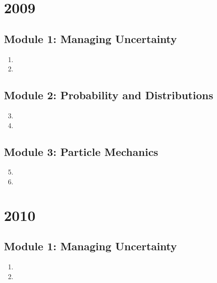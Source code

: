 \documentclass[fleqn,titlepage]{book}
\numberwithin{equation}{section}
\theoremstyle{plain}
\theoremstyle{definition}
\theoremstyle{remark}
\begin{document}
\chapter{2009}
\section{Module 1: Managing Uncertainty}
\begin{enumerate}[label=\bfseries  \arabic*.]\setcounter{enumi}{0}
\item 
\item 
\end{enumerate}
\section{Module 2: Probability and Distributions}
\begin{enumerate}[label=\bfseries  \arabic*.]\setcounter{enumi}{2}
\item 
\item 
\end{enumerate}
\section{Module 3: Particle Mechanics}
\begin{enumerate}[label=\bfseries  \arabic*.]\setcounter{enumi}{4}
\item 
\item 
\end{enumerate}

\chapter{2010}
\section{Module 1: Managing Uncertainty}
\begin{enumerate}[label=\bfseries  \arabic*.]\setcounter{enumi}{0}
\item 
\item 
\end{enumerate}
\end{document}
